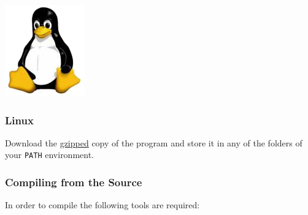 \begin{flushleft}
	\begin{minipage}[c]{0.074\textwidth}
   		\includegraphics[width=\textwidth]{figures/figLogoLinux.jpg}
	\end{minipage}
	\quad
	\begin{minipage}[t]{0.88\textwidth}
	   	\subsubsection{Linux}
	\end{minipage}

    Download the 
    \href{http://research.amnh.org/scicomp/projects/poy.php}{gzipped} copy of
    the program and store it in any of the folders of your \texttt{PATH}
    environment. 
\end{flushleft}


\subsubsection{Compiling from the Source}

In order to compile \poy the following tools are required:

